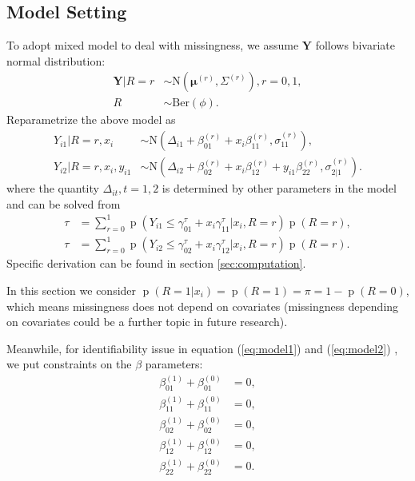 \documentclass[12pt]{article}
\DeclareMathOperator{\pr}{p}
\begin{document}
\subsection{Model Setting}
\label{sec:model}
To adopt mixed model to deal with missingness, we assume $\bm Y$
follows bivariate normal distribution:
\begin{align*}
  \bm{Y}|R = r &\sim \textrm{N}(\bm{\mu}^{(r)}, \Sigma^{(r)}), r = 0, 1,\\
  R & \sim \textrm{Ber}(\phi).
\end{align*}
Reparametrize the above model as
\begin{align}
  \label{eq:model1}
  Y_{i1}|R = r, x_i &\sim \textrm{N}(\Delta_{i1} + \beta_{01}^{(r)} + x_i\beta_{11}^{(r)}, \sigma_{11}^{(r)}),\\
  \label{eq:model2}
  Y_{i2}|R = r, x_i, y_{i1} & \sim \textrm{N}(\Delta_{i2} +
  \beta_{02}^{(r)} + x_i\beta_{12}^{(r)} + y_{i1}\beta_{22}^{(r)},
  \sigma_{2|1}^{(r)}).
\end{align}
where the quantity $\Delta_{it}, t = 1, 2$ is determined by other
parameters in the model and can be solved from
\begin{align}
  \label{eq:const1}
  \tau & =  \sum_{r = 0}^1 \pr (Y_{i1} \leq \gamma^{\tau}_{01} + x_i \gamma^{\tau}_{11} | x_i , R = r) \pr (R = r), \\
  \label{eq:const2}
  \tau & = \sum_{r = 0}^{1} \pr (Y_{i2} \leq \gamma^{\tau}_{02} + x_i
  \gamma^{\tau}_{12} | x_i , R = r) \pr (R = r).
\end{align}
Specific derivation can be found in section \ref{sec:computation}.

In this section we consider $\pr (R = 1|x_i) = \pr (R = 1) = \pi = 1 -
\pr (R = 0)$, which means missingness does not depend on covariates
(missingness depending on covariates could be a further topic in
future research).

Meanwhile, for identifiability issue in equation (\ref{eq:model1}) and
(\ref{eq:model2}) , we put constraints on the $\beta$ parameters:
\begin{align}
  \label{eq:beta01}
  \beta_{01}^{(1)} + \beta_{01}^{(0)} & = 0 ,\\
  \label{eq:beta11}
  \beta_{11}^{(1)} + \beta_{11}^{(0)} & = 0, \\
  \label{eq:beta02}
  \beta_{02}^{(1)} + \beta_{02}^{(0)} & = 0, \\
  \label{eq:beta12}
  \beta_{12}^{(1)} + \beta_{12}^{(0)} & = 0, \\
  \label{eq:beta22}
  \beta_{22}^{(1)} + \beta_{22}^{(0)} & = 0.
\end{align}
\end{document}
